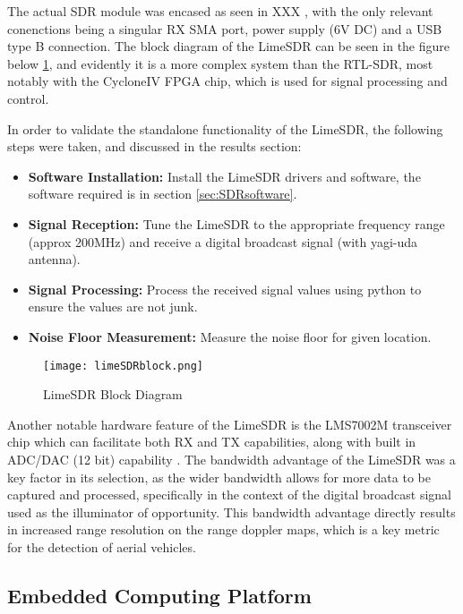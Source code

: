 The actual SDR module was encased as seen in XXX , with the only relevant conenctions being a singular RX SMA port, power supply (6V DC) and a USB type B connection. The block diagram of the LimeSDR can be seen in the figure below \ref{fig:limeSDRblock}, and evidently it is a more complex system than the RTL-SDR, most notably with the CycloneIV FPGA chip, which is used for signal processing and control.

In order to validate the standalone functionality of the LimeSDR, the following steps were taken, and discussed in the results section:
\begin{itemize}
    \item \textbf{Software Installation:} Install the LimeSDR drivers and software, the software required is in section \ref{sec:SDRsoftware}.
    \item \textbf{Signal Reception:} Tune the LimeSDR to the appropriate frequency range (approx 200MHz) and receive a digital broadcast signal (with yagi-uda antenna).
    \item \textbf{Signal Processing:} Process the received signal values using python to ensure the values are not junk.
    \item \textbf{Noise Floor Measurement:} Measure the noise floor for given location.
\end{itemize}

\begin{figure}[htbp]
    \centering
    \texttt{[image: limeSDRblock.png]}
    \caption{LimeSDR Block Diagram \cite{limesdr_usb}}
    \label{fig:limeSDRblock}
\end{figure}

Another notable hardware feature of the LimeSDR is the LMS7002M transceiver chip which can facilitate both RX and TX capabilities, along with built in ADC/DAC (12 bit) capability \cite{limesdr_usb}. The bandwidth advantage of the LimeSDR was a key factor in its selection, as the wider bandwidth allows for more data to be captured and processed, specifically in the context of the digital broadcast signal used as the illuminator of opportunity. This bandwidth advantage directly results in increased range resolution on the range doppler maps, which is a key metric for the detection of aerial vehicles. 


\subsection{Embedded Computing Platform \label{sec:embedded computing}}


